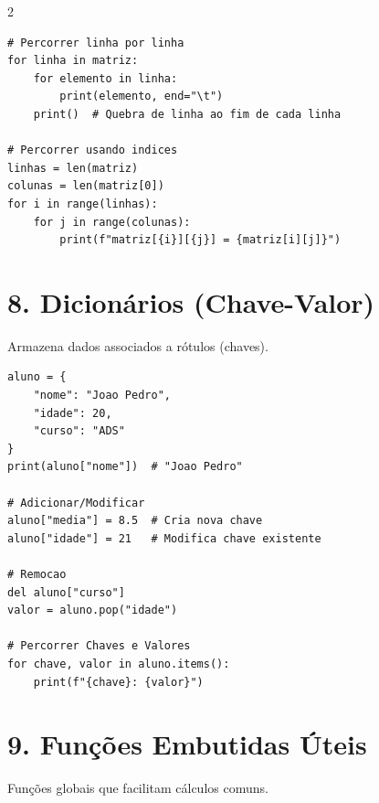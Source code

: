 \documentclass[10pt,a4paper]{article}
\begin{document}
\begin{multicols}{2}
\begin{minipage}{\linewidth}
\begin{lstlisting}
# Percorrer linha por linha
for linha in matriz:
    for elemento in linha:
        print(elemento, end="\t")
    print()  # Quebra de linha ao fim de cada linha

# Percorrer usando indices
linhas = len(matriz)
colunas = len(matriz[0])
for i in range(linhas):
    for j in range(colunas):
        print(f"matriz[{i}][{j}] = {matriz[i][j]}")
\end{lstlisting}
\end{minipage}
\vspace{0.4cm}

\noindent
\begin{minipage}{\linewidth}
\section*{8. Dicionários (Chave-Valor)}
Armazena dados associados a rótulos (chaves).
\begin{lstlisting}
aluno = {
    "nome": "Joao Pedro",
    "idade": 20,
    "curso": "ADS"
}
print(aluno["nome"])  # "Joao Pedro"

# Adicionar/Modificar
aluno["media"] = 8.5  # Cria nova chave
aluno["idade"] = 21   # Modifica chave existente

# Remocao
del aluno["curso"]
valor = aluno.pop("idade")

# Percorrer Chaves e Valores
for chave, valor in aluno.items():
    print(f"{chave}: {valor}")
\end{lstlisting}
\end{minipage}
\vspace{0.4cm}

\noindent
\begin{minipage}{\linewidth}
\section*{9. Funções Embutidas Úteis}
Funções globais que facilitam cálculos comuns.


\end{minipage}
\end{multicols}
\end{document}

